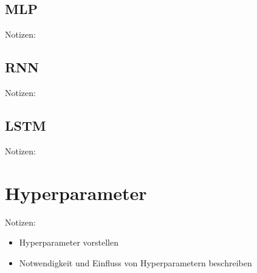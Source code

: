 \subsection{MLP}
Notizen:


\subsection{RNN}
Notizen:


\subsection{LSTM}
Notizen:


\section{Hyperparameter}
Notizen:
\begin{itemize}
	\item Hyperparameter vorstellen
	\item Notwendigkeit und Einfluss von Hyperparametern beschreiben
\end{itemize}
